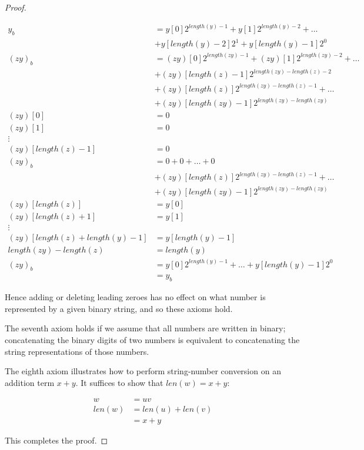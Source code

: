 \begin{proof}
\begin{enumerate}
   \begin{align*}
     y_{b} & = y[0] 2^{length(y)-1} + y[1] 2^{length(y) - 2} + \hdots \\
     & + y[length(y) - 2] 2^{1} + y[length(y)-1] 2^{0} \\
     (zy)_{b} & = (zy)[0] 2^{length(zy) - 1} + (zy)[1] 2^{length(zy) - 2} + \hdots \\
     & + (zy)[length(z)-1] 2^{length(zy) - length(z) - 2} \\
     & + (zy)[length(z)] 2^{length(zy) - length(z) - 1} + \hdots \\
     & + (zy)[length(zy) - 1] 2^{length(zy) - length(zy)} \\
     (zy)[0] & = 0 \\
     (zy)[1] & = 0 \\
     \vdots & \\
     (zy)[length(z)-1] & = 0 \\
     (zy)_{b} & = 0 + 0 + \hdots + 0 \\
     & + (zy)[length(z)] 2^{length(zy) - length(z) - 1} + \hdots \\
     & + (zy)[length(zy) - 1] 2^{length(zy) - length(zy)} \\
     (zy)[length(z)] & = y[0] \\
     (zy)[length(z) + 1] & = y[1] \\
     \vdots & \\
     (zy)[length(z) + length(y) - 1] & = y[length(y) - 1] \\
     length(zy) - length(z) & = length(y) \\
     (zy)_{b} & = y[0] 2^{length(y) - 1} + \hdots + y[length(y) - 1] 2^{0} \\
     & = y_{b}
   \end{align*}
  
  Hence adding or deleting leading zeroes has no effect on what number is represented by a given binary string, and so these axioms hold.
  
  The seventh axiom holds if we assume that all numbers are written in binary;
  concatenating the binary digits of two numbers is equivalent to
  concatenating the string representations of those numbers.
  


  The eighth axiom illustrates how to perform string-number conversion
  on an addition term $x + y$.  It suffices to show
  that $len(w) = x + y$:

  \begin{align*}
    w & = uv \\
    len(w) & = len(u) + len(v) \\
    & = x + y
  \end{align*}

  \end{enumerate}
  
This completes the proof.
\end{proof}

